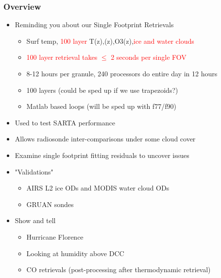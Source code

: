 \documentclass[10pt,t]{beamer}
\begin{document}
\begin{frame}
  \frametitle{Overview}

  \begin{itemize}
  \item Reminding you about our Single Footprint Retrievals
    \begin{itemize}
    \item Surf temp, \textcolor{red}{100 layer}
      T(z),\water(z),O3(z),\textcolor{red}{ice and water clouds}    
    \item \textcolor{red}{100 layer retrieval takes $\le$ 2 seconds per
        single FOV}    
    \item 8-12 hours per granule, 240 processors do entire day in 12 hours
    \item 100 layers (could be sped up if we use trapezoids?)
    \item Matlab based loops (will be sped up with f77/f90)
    \end{itemize}
  \item Used to test SARTA performance
  \item Allows radiosonde inter-comparisons under some cloud cover
  \item Examine single footprint fitting residuals to uncover issues
  \item "Validations"
    \begin{itemize}
    \item AIRS L2 ice ODs and MODIS water cloud ODs
    \item GRUAN sondes
    \end{itemize}
  \item Show and tell
    \begin{itemize}
    \item Hurricane Florence
    \item Looking at humidity above DCC
    \item CO retrievals (post-processing after thermodynamic retrieval)
    \end{itemize}
  \end{itemize}
\end{frame}
\end{document}
